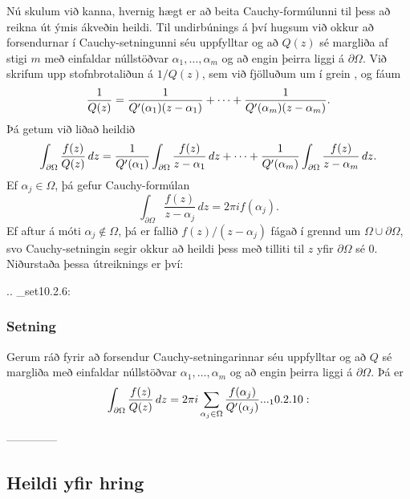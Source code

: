Nú skulum við kanna, hvernig hægt er að beita Cauchy-formúlunni til
þess að reikna út ýmis ákveðin heildi.  Til undirbúnings á því hugsum
við okkur að forsendurnar í Cauchy-setningunni séu uppfylltar og að
$Q(z)$ sé margliða af stigi $m$ með einfaldar núllstöðvar
$\alpha_1,\dots,\alpha_m$ og að engin þeirra liggi á
$\partial\Omega$.  Við skrifum upp stofnbrotaliðun á $1/Q(z)$, sem
við fjölluðum um í grein , og fáum 
 $$\dfrac 1{Q(z)} = \dfrac 1{Q{\sp{\prime}}(\alpha_1)(z-\alpha_1)}+\cdots+
\dfrac 1{Q{\sp{\prime}}(\alpha_m)(z-\alpha_m)}.
 $$
Þá getum við liðað heildið
 $$\int_{\partial\Omega}\dfrac{f(z)}{Q(z)}\, dz =
\dfrac 1{Q{\sp{\prime}}(\alpha_1)}\int_{\partial\Omega}\dfrac{f(z)}{z-\alpha_1}\,
dz 
+\cdots+
\dfrac 1{Q{\sp{\prime}}(\alpha_m)}\int_{\partial\Omega}\dfrac{f(z)}{z-\alpha_m}\,
dz. 
 $$
Ef $\alpha_j\in \Omega$, þá gefur Cauchy-formúlan
$$
\int_{\partial\Omega}\dfrac{f(z)}{z-\alpha_j}\,
dz  = 2\pi i f(\alpha_j).
$$
Ef aftur á móti $\alpha_j\not\in\Omega$, þá er fallið
$f(z)/(z-\alpha_j)$ fágað í grennd um $\Omega\cup\partial\Omega$, svo
Cauchy-setningin segir okkur að heildi þess með tilliti til $z$ yfir
$\partial\Omega$ sé $0$.  Niðurstaða þessa útreiknings er því:


.. _set10.2.6:

\subsubsection{Setning}
Gerum ráð fyrir að forsendur Cauchy-setningarinnar séu uppfylltar og
að $Q$ sé margliða með einfaldar núllstöðvar
$\alpha_1,\dots,\alpha_m$ og að engin þeirra liggi á
$\partial\Omega$.  Þá er
 \begin{equation*}\int_{\partial\Omega} \dfrac{f(z)}{Q(z)} \, dz =
2\pi i\sum_{\alpha_j\in \Omega}
\dfrac{f(\alpha_j)}{Q\dash(\alpha_j)}.


.. _10.2.10:

 \end{equation*}


--------------



\subsection*{Heildi yfir hring}

